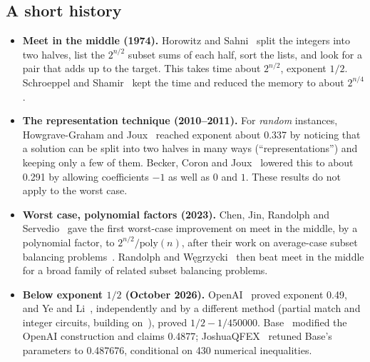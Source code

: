 \documentclass[11pt]{article}
\newcommand{\poly}{\mathrm{poly}}
\theoremstyle{plain}
\begin{document}
\subsection*{A short history}
\begin{itemize}
\item \textbf{Meet in the middle (1974).} Horowitz and Sahni~\cite{hs} split the integers into two halves, list the $2^{n/2}$ subset sums of each half, sort the lists, and look for a pair that adds up to the target. This takes time about $2^{n/2}$, exponent $1/2$. Schroeppel and Shamir~\cite{ss} kept the time and reduced the memory to about $2^{n/4}$.
\item \textbf{The representation technique (2010--2011).} For \emph{random} instances, Howgrave-Graham and Joux~\cite{hgj} reached exponent about 0.337 by noticing that a solution can be split into two halves in many ways (``representations'') and keeping only a few of them. Becker, Coron and Joux~\cite{bcj} lowered this to about 0.291 by allowing coefficients $-1$ as well as $0$ and $1$. These results do not apply to the worst case.
\item \textbf{Worst case, polynomial factors (2023).} Chen, Jin, Randolph and Servedio~\cite{cjrs23} gave the first worst-case improvement on meet in the middle, by a polynomial factor, to $2^{n/2}/\poly(n)$, after their work on average-case subset balancing problems~\cite{cjrs22}. Randolph and W\k{e}grzycki~\cite{rw} then beat meet in the middle for a broad family of related subset balancing problems.
\item \textbf{Below exponent $1/2$ (October 2026).} OpenAI~\cite{openai} proved exponent 0.49, and Ye and Li~\cite{yeli}, independently and by a different method (partial match and integer circuits, building on~\cite{rw}), proved $1/2 - 1/450000$. Base~\cite{base} modified the OpenAI construction and claims 0.4877; JoshuaQFEX~\cite{joshua} retuned Base's parameters to 0.487676, conditional on 430 numerical inequalities.
\end{itemize}
\end{document}
